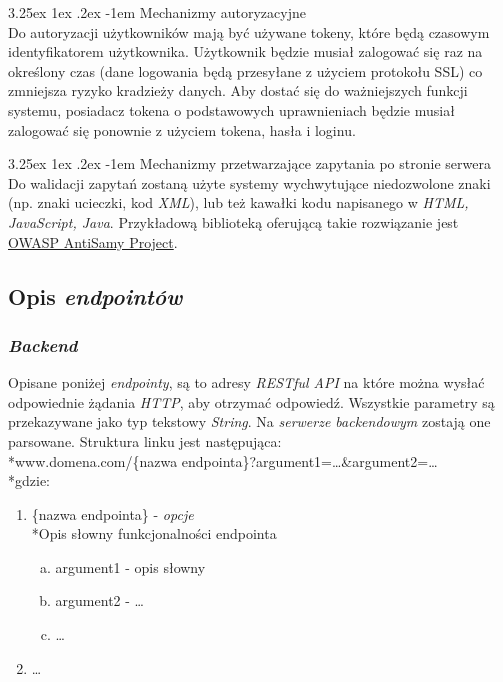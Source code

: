 \documentclass[10pt,titlepage]{article} %
\makeatletter
\renewcommand{\normalsize}{\fontsize{8pt}{10pt}\selectfont} %
\renewcommand\paragraph{\@startsection{paragraph}{5}{\z@}%
  {3.25ex \@plus1ex \@minus.2ex}%
  {-1em}%
  {\normalfont\normalsize\bfseries}}
\makeatother
\begin{document}
\paragraph{Mechanizmy autoryzacyjne}\mbox{}\\
Do autoryzacji użytkowników mają być używane tokeny, które będą czasowym identyfikatorem użytkownika. Użytkownik będzie musiał zalogować się raz na określony czas (dane logowania będą przesyłane z użyciem protokołu SSL) co zmniejsza ryzyko kradzieży danych. Aby dostać się do ważniejszych funkcji systemu, posiadacz tokena o podstawowych uprawnieniach będzie musiał zalogować się ponownie z użyciem tokena, hasła i loginu.

\paragraph{Mechanizmy przetwarzające zapytania po stronie serwera}\mbox{}\\
Do walidacji zapytań zostaną użyte systemy wychwytujące niedozwolone znaki (np. znaki ucieczki, kod \textit{XML}), lub też kawałki kodu napisanego w \textit{HTML, JavaScript, Java}. Przykładową biblioteką oferującą takie rozwiązanie jest \href{https://www.owasp.org/index.php/Category:OWASP_AntiSamy_Project#tab=Main}{OWASP AntiSamy Project}\cite{owaspAntiSammyProject}.


\newpage
\subsection{Opis \textit{endpointów}}
\subsubsection{\textit{Backend}}
Opisane poniżej \textit{endpointy}, są to adresy \textit{RESTful API} na które można wysłać odpowiednie żądania \textit{HTTP}, aby otrzymać odpowiedź.
Wszystkie parametry są przekazywane jako typ tekstowy \textit{String}. Na \textit{serwerze backendowym} zostają one parsowane.
Struktura linku jest następująca:\\*www.domena.com/\{nazwa endpointa\}?argument1=\ldots\&argument2=\ldots\\*gdzie:
\begin{enumerate}[1.]
\item \{nazwa endpointa\} - \textit{opcje}
\\*Opis słowny funkcjonalności endpointa
\begin{enumerate}[a.]
\item argument1 - opis słowny
\item argument2 - \ldots
\item \ldots
\end{enumerate}
\item \ldots
\end{enumerate}
\end{document}
